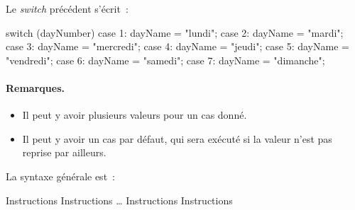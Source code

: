 	Le \textit{switch} précédent s'écrit~:

	\begin{java}
switch (dayNumber) {
	case 1: 
		dayName = "lundi"; 
	case 2: 
		dayName = "mardi"; 
	case 3: 
		dayName = "mercredi"; 
	case 4: 
		dayName = "jeudi"; 
	case 5: 
		dayName = "vendredi"; 
	case 6: 
		dayName = "samedi"; 
	case 7: 
		dayName = "dimanche";
}
	\end{java}
		
	\paragraph{Remarques.}
	\begin{itemize}
	\item
		Il peut y avoir plusieurs valeurs pour un cas donné.
	\item
		Il peut y avoir un cas par défaut, 
		qui sera exécuté si la valeur n’est pas reprise par ailleurs.
	\end{itemize}
	
	La syntaxe générale est~:
	
	\begin{pseudocode}
				\Stmt Instructions
				\Stmt Instructions
			\Empty \dots
				\Stmt Instructions
				\Stmt Instructions
		\EndSwitch
	\end{pseudocode}
	
	
